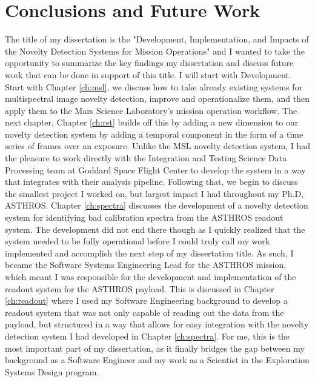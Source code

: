 \chapter{Conclusions and Future Work}
\label{ch:conclusion}
The title of my dissertation is the "Development, Implementation, and Impacts of the Novelty Detection Systems for Mission Operations" and I wanted to take the opportunity to summarize the key findings my dissertation and discuss future work that can be done in support of this title. 
I will start with Development. 
Start with Chapter \ref{ch:msl}, we discuss how to take already existing systems for multispectral image novelty detection, improve and operationalize them, and then apply them to the Mars Science Laboratory's mission operation workflow.
The next chapter, Chapter \ref{ch:rst} builds off this by adding a new dimension to our novelty detection system by adding a temporal component in the form of a time series of frames over an exposure.
Unlike the MSL novelty detection system, I had the pleasure to work directly with the Integration and Testing Science Data Processing team at Goddard Space Flight Center to develop the system in a way that integrates with their analysis pipeline.
Following that, we begin to discuss the smallest project I worked on, but largest impact I had throughout my Ph.D, ASTHROS. 
Chapter \ref{ch:spectra} discusses the development of a novelty detection system for identifying bad calibration spectra from the ASTHROS readout system.
The development did not end there though as I quickly realized that the system needed to be fully operational before I could truly call my work implemented and accomplish the next step of my dissertation title.
As such, I became the Software Systems Engineering Lead for the ASTHROS mission, which meant I was responsible for the development and implementation of the readout system for the ASTHROS payload.
This is discussed in Chapter \ref{ch:readout} where I used my Software Engineering background to develop a readout system that was not only capable of reading out the data from the payload, but structured in a way that allows for easy integration with the novelty detection system I had developed in Chapter \ref{ch:spectra}.
For me, this is the most important part of my dissertation, as it finally bridges the gap between my background as a Software Engineer and my work as a Scientist in the Exploration Systems Design program.

